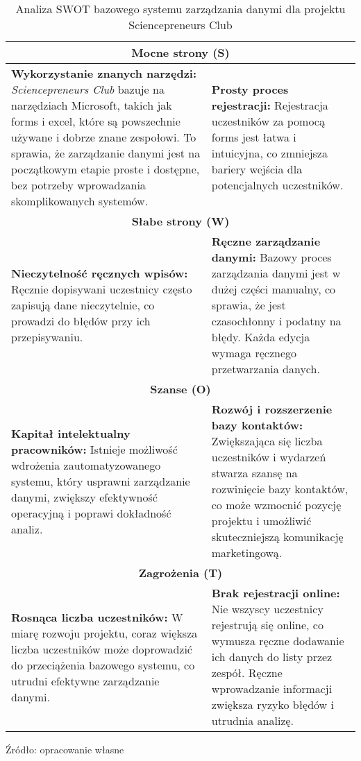 \begin{table}[ht]
    \centering
    \small %
    \caption[Analiza SWOT bazowego systemu zarządzania danymi dla projektu Sciencepreneurs Club, źródło: opracowanie własne]{Analiza SWOT bazowego systemu zarządzania danymi dla projektu Sciencepreneurs Club}
    \label{tab:swot}
    \begin{tabular}{|p{7cm}|p{7cm}|}
        \hline
        \multicolumn{2}{|c|}{\textbf{Mocne strony (S)}} \\
        \hline
        \textbf{Wykorzystanie znanych narzędzi:} \textit{Sciencepreneurs Club} bazuje na narzędziach Microsoft, takich jak \gls{forms} i \gls{excel}, które są powszechnie używane i dobrze znane zespołowi. To sprawia, że zarządzanie danymi jest na początkowym etapie proste i dostępne, bez potrzeby wprowadzania skomplikowanych systemów. &
        \textbf{Prosty proces rejestracji:} Rejestracja uczestników za pomocą \gls{forms} jest łatwa i intuicyjna, co zmniejsza bariery wejścia dla potencjalnych uczestników. \\
        \hline
        \multicolumn{2}{|c|}{\textbf{Słabe strony (W)}} \\
        \hline
        \textbf{Nieczytelność ręcznych wpisów:} Ręcznie dopisywani uczestnicy często zapisują dane nieczytelnie, co prowadzi do błędów przy ich przepisywaniu. &
        \textbf{Ręczne zarządzanie danymi:} Bazowy proces zarządzania danymi jest w dużej części manualny, co sprawia, że jest czasochłonny i podatny na błędy. Każda edycja wymaga ręcznego przetwarzania danych. \\
        \hline
        \multicolumn{2}{|c|}{\textbf{Szanse (O)}} \\
        \hline
        \textbf{Kapitał intelektualny pracowników:} Istnieje możliwość wdrożenia zautomatyzowanego systemu, który usprawni zarządzanie danymi, zwiększy efektywność operacyjną i poprawi dokładność analiz. &
        \textbf{Rozwój i rozszerzenie bazy kontaktów:} Zwiększająca się liczba uczestników i wydarzeń stwarza szansę na rozwinięcie bazy kontaktów, co może wzmocnić pozycję projektu i umożliwić skuteczniejszą komunikację marketingową. \\
        \hline
        \multicolumn{2}{|c|}{\textbf{Zagrożenia (T)}} \\
        \hline
        \textbf{Rosnąca liczba uczestników:} W miarę rozwoju projektu, coraz większa liczba uczestników może doprowadzić do przeciążenia bazowego systemu, co utrudni efektywne zarządzanie danymi. &
        \textbf{Brak rejestracji online:} Nie wszyscy uczestnicy rejestrują się online, co wymusza ręczne dodawanie ich danych do listy przez zespół. Ręczne wprowadzanie informacji zwiększa ryzyko błędów i utrudnia analizę. \\
        \hline
    \end{tabular}
    \vspace{0.5em}
    \par\raggedright\footnotesize{Źródło: opracowanie własne}
\end{table}


